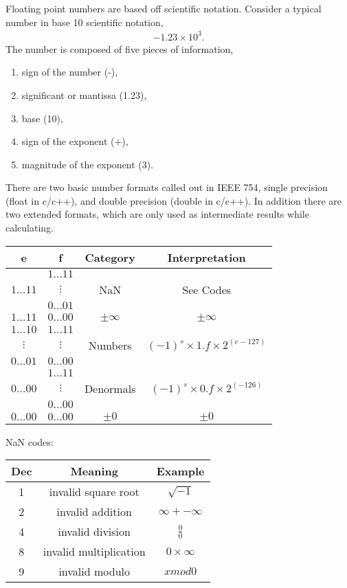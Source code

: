 Floating point numbers are based off scientific notation.  Consider a typical number in base 10 scientific notation,
\begin{eqnarray*}
  -1.23 \times 10^{3}.
\end{eqnarray*}
The number is composed of five pieces of information,
\begin{enumerate}
    \item sign of the number (-),
    \item significant or mantissa (1.23),
    \item base (10),
    \item sign of the exponent (+),
    \item magnitude of the exponent (3).
\end{enumerate}


There are two basic number formats called out in IEEE 754, single precision (float in c/c++), and double precision (double in c/c++).  In addition there are two extended formats, which are only used as intermediate results while calculating.
\vspace{6pt}

\begin{tabular}{|c|c|c|c|}
  \hline
   e & f & Category & Interpretation \\
  \hline
    & $1\ldots 11$ & &  \\
   $1\ldots 11$ & $\vdots$ & NaN & See Codes \\
    & $0\ldots 01$ & &  \\ \hline
   $1\ldots 11$ & $0\ldots 00$ & $\pm\infty$ & $\pm\infty$ \\ \hline
   $1\ldots 10$ & $1\ldots 11$ & &  \\
   $\vdots$ & $\vdots$ & Numbers & $(-1)^s\times 1.f \times 2^{(e-127)}$ \\
   $0\ldots 01$ & $0\ldots 00$ & &  \\ \hline
    & $1\ldots 11$ & &  \\
   $0\ldots 00$ & $\vdots$ & Denormals & $(-1)^s\times 0.f \times 2^{(-126)}$ \\
    & $0\ldots 00$ & &  \\ \hline
   $0\ldots 00$ & $0\ldots 00$ & $\pm 0$ & $\pm 0$ \\ \hline
\end{tabular}

\vspace{6pt}\noindent
NaN codes:
\vspace{6pt}

\begin{tabular}{|c|c|c|}
  \hline
  Dec & Meaning                & Example \\ \hline
  1   & invalid square root    & $\sqrt{-1}$ \\
  2   & invalid addition       & $\infty + -\infty$ \\
  4   & invalid division       & $\frac{0}{0}$ \\
  8   & invalid multiplication & $0\times\infty$ \\
  9   & invalid modulo         & $x mod 0$ \\
   \hline
\end{tabular}

